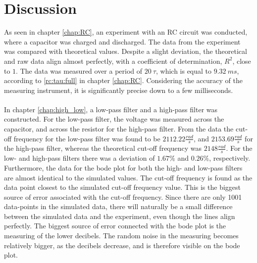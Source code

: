 \chapter{Discussion}
As seen in chapter \ref{chap:RC}, an experiment with an RC circuit was conducted, where a capacitor was charged and discharged. The data from the experiment was compared with theoretical values. Despite a slight deviation, the theoretical and raw data align almost perfectly, with a coefficient of determination, $R^2$, close to $1$. The data was measured over a period of $20\ \tau$, which is equal to $9.32\ ms$, according to \eqref{rc:tau:full} in chapter \ref{chap:RC}. Considering the accuracy of the measuring instrument, it is significantly precise down to a few milliseconds. 
\\ \\
In chapter \ref{chap:high_low}, a low-pass filter and a high-pass filter was constructed. For the low-pass filter, the voltage was measured across the capacitor, and across the resistor for the high-pass filter. From the data the cut-off frequency for the low-pass filter was found to be $2112.22 \frac{rad}{s}$, and $2153.69 \frac{rad}{s}$ for the high-pass filter, whereas the theoretical cut-off frequency was $2148 \frac{rad}{s}$. For the low- and high-pass filters there was a deviation of $1.67 \% $ and $0.26 \%$, respectively. Furthermore, the data for the bode plot for both the high- and low-pass filters are almost identical to the simulated values. The cut-off frequency is found as the data point closest to the simulated cut-off frequency value. This is the biggest source of error associated with the cut-off frequency. Since there are only 1001 data-points in the simulated data, there will naturally be a small difference between the simulated data and the experiment, even though the lines align perfectly. The biggest source of error connected with the bode plot is the measuring of the lower decibels. The random noise in the measuring becomes relatively bigger, as the decibels decrease, and is therefore visible on the bode plot.